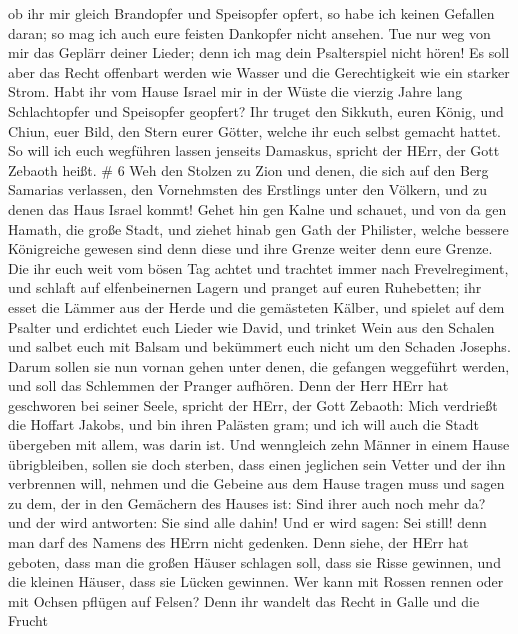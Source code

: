 ob ihr mir gleich Brandopfer und Speisopfer opfert, so habe ich keinen
Gefallen daran; so mag ich auch eure feisten Dankopfer nicht ansehen.
 Tue nur weg von mir das Geplärr deiner Lieder; denn ich
mag dein Psalterspiel nicht hören!  Es soll aber das Recht
offenbart werden wie Wasser und die Gerechtigkeit wie ein starker Strom.
 Habt ihr vom Hause Israel mir in der Wüste die vierzig
Jahre lang Schlachtopfer und Speisopfer geopfert?  Ihr
truget den Sikkuth, euren König, und Chiun, euer Bild, den Stern eurer
Götter, welche ihr euch selbst gemacht hattet.  So will ich
euch wegführen lassen jenseits Damaskus, spricht der HErr, der Gott
Zebaoth heißt. \# 6  Weh den Stolzen zu Zion und denen, die
sich auf den Berg Samarias verlassen, den Vornehmsten des Erstlings
unter den Völkern, und zu denen das Haus Israel kommt! 
Gehet hin gen Kalne und schauet, und von da gen Hamath, die große Stadt,
und ziehet hinab gen Gath der Philister, welche bessere Königreiche
gewesen sind denn diese und ihre Grenze weiter denn eure Grenze.
 Die ihr euch weit vom bösen Tag achtet und trachtet immer
nach Frevelregiment,  und schlaft auf elfenbeinernen Lagern
und pranget auf euren Ruhebetten; ihr esset die Lämmer aus der Herde und
die gemästeten Kälber,  und spielet auf dem Psalter und
erdichtet euch Lieder wie David,  und trinket Wein aus den
Schalen und salbet euch mit Balsam und bekümmert euch nicht um den
Schaden Josephs.  Darum sollen sie nun vornan gehen unter
denen, die gefangen weggeführt werden, und soll das Schlemmen der
Pranger aufhören.  Denn der Herr HErr hat geschworen bei
seiner Seele, spricht der HErr, der Gott Zebaoth: Mich verdrießt die
Hoffart Jakobs, und bin ihren Palästen gram; und ich will auch die Stadt
übergeben mit allem, was darin ist.  Und wenngleich zehn
Männer in einem Hause übrigbleiben, sollen sie doch sterben,
 dass einen jeglichen sein Vetter und der ihn verbrennen
will, nehmen und die Gebeine aus dem Hause tragen muss und sagen zu dem,
der in den Gemächern des Hauses ist: Sind ihrer auch noch mehr da? und
der wird antworten: Sie sind alle dahin! Und er wird sagen: Sei still!
denn man darf des Namens des HErrn nicht gedenken.  Denn
siehe, der HErr hat geboten, dass man die großen Häuser schlagen soll,
dass sie Risse gewinnen, und die kleinen Häuser, dass sie Lücken
gewinnen.  Wer kann mit Rossen rennen oder mit Ochsen
pflügen auf Felsen? Denn ihr wandelt das Recht in Galle und die Frucht
